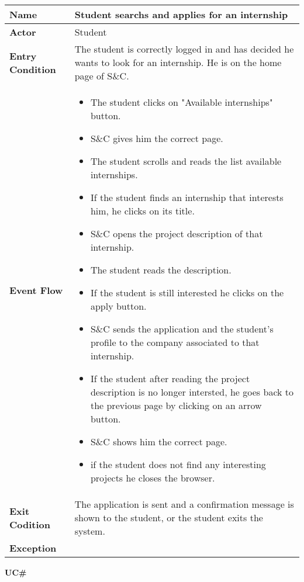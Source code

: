 \begin{longtable}{|p{}|p{}|}
\hline
\textbf{Name} &  Student searchs and applies for an internship\\
\hline
\textbf{Actor} &  Student\\
\hline
\textbf{Entry Condition} &  The student is correctly logged in and has decided he wants to look for an internship. He is on the home page of S\&C.\\
\hline
\textbf{Event Flow} &  
\begin{itemize}
    \item The student clicks on "Available internships" button.
    \item S\&C gives him the correct page.
    \item The student scrolls and reads the list available internships.
    \item If the student finds an internship that interests him, he clicks on its title.
    \item S\&C opens the project description of that internship.
    \item The student reads the description.
    \item If the student is still interested he clicks on the apply button.
    \item S\&C sends the application and the student's profile to the company associated to that internship.
    \item If the student after reading the project description is no longer intersted, he goes back to the previous page by clicking on an arrow button.
    \item S\&C shows him the correct page.
    \item if the student does not find any interesting projects he closes the browser.
\end{itemize} \\
\hline
\textbf{Exit Codition} &  The application is sent and a confirmation message is shown to the student, or the student exits the system.\\
\hline
\textbf{Exception} &  \\
\hline
\end{longtable}


\textbf{UC\#}

